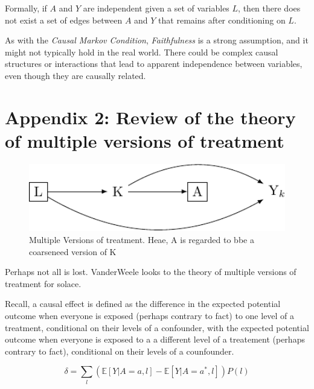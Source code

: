\documentclass[
  singlecolumn]{report}
\begin{document}
Formally, if \(A\) and \(Y\) are independent given a set of variables
\(L\), then there does not exist a set of edges between \(A\) and \(Y\)
that remains after conditioning on \(L\).

As with the \emph{Causal Markov Condition}, \emph{Faithfulness} is a
strong assumption, and it might not typically hold in the real world.
There could be complex causal structures or interactions that lead to
apparent independence between variables, even though they are causally
related.

\hypertarget{appendix-2-review-of-the-theory-of-multiple-versions-of-treatment}{%
\section{Appendix 2: Review of the theory of multiple versions of
treatment}\label{appendix-2-review-of-the-theory-of-multiple-versions-of-treatment}}

\begin{figure}

{\centering \includegraphics[width=1\textwidth,height=\textheight]{causal-dags_files/figure-pdf/fig_dag_multiple_version_treatment_dag-1.pdf}

}

\caption{Multiple Versions of treatment. Heae, A is regarded to bbe a
coarseneed version of K}

\end{figure}

Perhaps not all is lost. VanderWeele looks to the theory of multiple
versions of treatment for solace.

Recall, a causal effect is defined as the difference in the expected
potential outcome when everyone is exposed (perhaps contrary to fact) to
one level of a treatment, conditional on their levels of a confounder,
with the expected potential outcome when everyone is exposed to a a
different level of a treatement (perhaps contrary to fact), conditional
on their levels of a counfounder.

\[ \delta = \sum_l \left( \mathbb{E}[Y|A=a,l] - \mathbb{E}[Y|A=a^*,l] \right) P(l)\]
\end{document}
